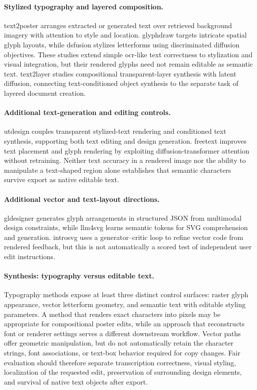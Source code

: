 \paragraph{Stylized typography and layered composition.}
\ac{text2poster} arranges extracted or generated text over retrieved background imagery with attention to style and location.
\ac{glyphdraw} targets intricate spatial glyph layouts, while \ac{dsfusion} stylizes letterforms using discriminated diffusion objectives.
These studies extend simple \ac{ocr}-like text correctness to stylization and visual integration, but their rendered glyphs need not remain editable as semantic text.
\ac{text2layer} studies compositional transparent-layer synthesis with latent diffusion, connecting text-conditioned object synthesis to the separate task of layered document creation.

\paragraph{Additional text-generation and editing controls.}
\ac{utdesign} couples transparent stylized-text rendering and conditioned text synthesis, supporting both text editing and design generation.
\ac{freetext} improves text placement and glyph rendering by exploiting diffusion-transformer attention without retraining.
Neither text accuracy in a rendered image nor the ability to manipulate a text-shaped region alone establishes that semantic characters survive export as native editable text.
\paragraph{Additional vector and text-layout directions.}
\ac{gldesigner} generates glyph arrangements in structured JSON from multimodal design constraints, while \ac{llm4svg} learns semantic tokens for SVG comprehension and generation.
\ac{introsvg} uses a generator--critic loop to refine vector code from rendered feedback, but this is not automatically a scored test of independent user edit instructions.

\paragraph{Synthesis: typography versus editable text.}
Typography methods expose at least three distinct control surfaces: raster glyph appearance, vector letterform geometry, and semantic text with editable styling parameters.
A method that renders exact characters into pixels may be appropriate for compositional poster edits, while an approach that reconstructs font or renderer settings serves a different downstream workflow.
Vector paths offer geometric manipulation, but do not automatically retain the character strings, font associations, or text-box behavior required for copy changes.
Fair evaluation should therefore separate transcription correctness, visual styling, localization of the requested edit, preservation of surrounding design elements, and survival of native text objects after export.


